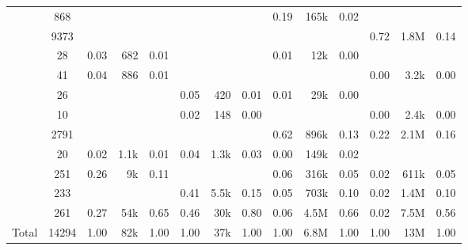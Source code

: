 \documentclass[
]{article}
\begin{document}
\begin{table}
\begin{tabular}[t]{rcrrcrrcrrcrrr}
 & 868 & \cellcolor{gray}{  } & \cellcolor{gray}{  } & \cellcolor{gray}{  } & \cellcolor{gray}{  } & \cellcolor{gray}{  } & \cellcolor{gray}{  } & 0.19 & 165k & 0.02 & \cellcolor{gray}{  } & \cellcolor{gray}{  } & \cellcolor{gray}{  }\\
 & 9373 & \cellcolor{gray}{  } & \cellcolor{gray}{  } & \cellcolor{gray}{  } & \cellcolor{gray}{  } & \cellcolor{gray}{  } & \cellcolor{gray}{  } & \cellcolor{gray}{  } & \cellcolor{gray}{  } & \cellcolor{gray}{  } & 0.72 & 1.8M & 0.14\\
\addlinespace
 & 28 & 0.03 & 682 & 0.01 & \cellcolor{gray}{  } & \cellcolor{gray}{  } & \cellcolor{gray}{  } & 0.01 & 12k & 0.00 & \cellcolor{gray}{  } & \cellcolor{gray}{  } & \cellcolor{gray}{  }\\
 & 41 & 0.04 & 886 & 0.01 & \cellcolor{gray}{  } & \cellcolor{gray}{  } & \cellcolor{gray}{  } & \cellcolor{gray}{  } & \cellcolor{gray}{  } & \cellcolor{gray}{  } & 0.00 & 3.2k & 0.00\\
 & 26 & \cellcolor{gray}{  } & \cellcolor{gray}{  } & \cellcolor{gray}{  } & 0.05 & 420 & 0.01 & 0.01 & 29k & 0.00 & \cellcolor{gray}{  } & \cellcolor{gray}{  } & \cellcolor{gray}{  }\\
 & 10 & \cellcolor{gray}{  } & \cellcolor{gray}{  } & \cellcolor{gray}{  } & 0.02 & 148 & 0.00 & \cellcolor{gray}{  } & \cellcolor{gray}{  } & \cellcolor{gray}{  } & 0.00 & 2.4k & 0.00\\
 & 2791 & \cellcolor{gray}{  } & \cellcolor{gray}{  } & \cellcolor{gray}{  } & \cellcolor{gray}{  } & \cellcolor{gray}{  } & \cellcolor{gray}{  } & 0.62 & 896k & 0.13 & 0.22 & 2.1M & 0.16\\
\addlinespace
 & 20 & 0.02 & 1.1k & 0.01 & 0.04 & 1.3k & 0.03 & 0.00 & 149k & 0.02 & \cellcolor{gray}{  } & \cellcolor{gray}{  } & \cellcolor{gray}{  }\\
 & 251 & 0.26 & 9k & 0.11 & \cellcolor{gray}{  } & \cellcolor{gray}{  } & \cellcolor{gray}{  } & 0.06 & 316k & 0.05 & 0.02 & 611k & 0.05\\
 & 233 & \cellcolor{gray}{  } & \cellcolor{gray}{  } & \cellcolor{gray}{  } & 0.41 & 5.5k & 0.15 & 0.05 & 703k & 0.10 & 0.02 & 1.4M & 0.10\\
\addlinespace
 & 261 & 0.27 & 54k & 0.65 & 0.46 & 30k & 0.80 & 0.06 & 4.5M & 0.66 & 0.02 & 7.5M & 0.56\\
\midrule
Total & 14294 & 1.00 & 82k & 1.00 & 1.00 & 37k & 1.00 & 1.00 & 6.8M & 1.00 & 1.00 & 13M & 1.00\\
\bottomrule
\end{tabular}
\end{table}
\end{document}

